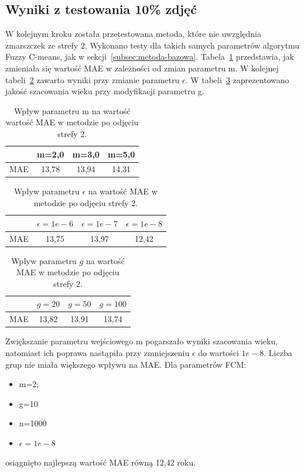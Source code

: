 \documentclass[a4paper,twoside,12pt]{book}
\begin{document}
    \subsection*{Wyniki z testowania 10\% zdjęć}
    W kolejnym kroku została przetestowana metoda, które nie uwzględnia zmarszczek ze strefy 2.
    Wykonano testy dla takich samych parametrów algorytmu Fuzzy C-means, jak w sekcji~\ref{subsec:metoda-bazowa}.
    Tabela~\ref{tab.odjeta_m} przedstawia, jak zmieniała się wartość MAE w zależności od zmian parametru m.
    W kolejnej tabeli~\ref{tab.odjeta_e} zawarto wyniki przy
    zmianie parametru $\epsilon$.
    W tabeli~\ref{tab.odjeta_g} zaprezentowano
    jakość szacowania
    wieku przy modyfikacji parametru g.
    \begin{table}[h!]
        \centering
        \caption{Wpływ parametru m na wartość wartość MAE w metodzie po odjęciu strefy 2.}
        \begin{tabular}{|c|c|c|c|}
            \hline
            & m=2,0 & m=3,0 & m=5,0 \\ \hline
            MAE & 13,78 & 13,94 & 14,31 \\ \hline
        \end{tabular}
        \label{tab.odjeta_m}
    \end{table}
    \begin{table}[h!]
        \centering
        \caption{Wpływ parametru $\epsilon$ na wartość MAE w metodzie po odjęciu strefy 2.}
        \begin{tabular}{|c|c|c|c|}
            \hline
            & $\epsilon=1e-6$ & $\epsilon=1e-7$ & $\epsilon=1e-8$ \\ \hline
            MAE & 13,75 & 13,97 & 12,42 \\ \hline
        \end{tabular}
        \label{tab.odjeta_e}
    \end{table}
    \begin{table}[h!]
        \centering
        \caption{Wpływ parametru $g$ na wartość MAE w metodzie po odjęciu strefy 2.}
        \begin{tabular}{|c|c|c|c|}
            \hline
            & $g=20$ & $g=50$ & $g=100$ \\ \hline
            MAE & 13,82 & 13,91 & 13,74 \\ \hline
        \end{tabular}
        \label{tab.odjeta_g}
    \end{table}

    Zwiększanie parametru wejściowego m pogarszało wyniki szacowania wieku, natomiast ich poprawa nastąpiła przy
    zmniejszeniu $\epsilon$ do wartości $1e-8$. Liczba grup nie miała większego wpływu na MAE.
    Dla parametrów FCM:
    \begin{itemize}
        \item m=2;
        \item g=10
        \item n=1000
        \item $\epsilon=1e-8$
    \end{itemize}
    osiągnięto najlepszą wartość MAE równą 12,42 roku.
\end{document}
